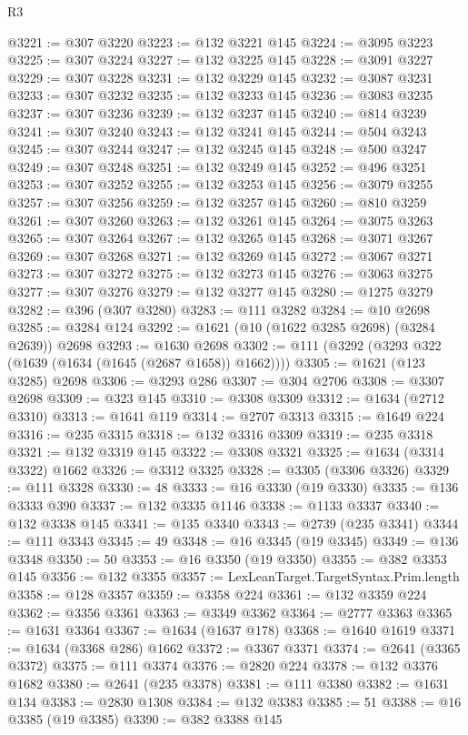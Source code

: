\begin{lexlean}{R3}
\begin{coremodule}
@3221 := @307 @3220
@3223 := @132 @3221 @145
@3224 := @3095 @3223
@3225 := @307 @3224
@3227 := @132 @3225 @145
@3228 := @3091 @3227
@3229 := @307 @3228
@3231 := @132 @3229 @145
@3232 := @3087 @3231
@3233 := @307 @3232
@3235 := @132 @3233 @145
@3236 := @3083 @3235
@3237 := @307 @3236
@3239 := @132 @3237 @145
@3240 := @814 @3239
@3241 := @307 @3240
@3243 := @132 @3241 @145
@3244 := @504 @3243
@3245 := @307 @3244
@3247 := @132 @3245 @145
@3248 := @500 @3247
@3249 := @307 @3248
@3251 := @132 @3249 @145
@3252 := @496 @3251
@3253 := @307 @3252
@3255 := @132 @3253 @145
@3256 := @3079 @3255
@3257 := @307 @3256
@3259 := @132 @3257 @145
@3260 := @810 @3259
@3261 := @307 @3260
@3263 := @132 @3261 @145
@3264 := @3075 @3263
@3265 := @307 @3264
@3267 := @132 @3265 @145
@3268 := @3071 @3267
@3269 := @307 @3268
@3271 := @132 @3269 @145
@3272 := @3067 @3271
@3273 := @307 @3272
@3275 := @132 @3273 @145
@3276 := @3063 @3275
@3277 := @307 @3276
@3279 := @132 @3277 @145
@3280 := @1275 @3279
@3282 := @396 (@307 @3280)
@3283 := @111 @3282
@3284 := @10 @2698
@3285 := @3284 @124
@3292 := @1621 (@10 (@1622 @3285 @2698) (@3284 @2639)) @2698
@3293 := @1630 @2698
@3302 := @111 (@3292 (@3293 @322 (@1639 (@1634 (@1645 (@2687 @1658)) @1662))))
@3305 := @1621 (@123 @3285) @2698
@3306 := @3293 @286
@3307 := @304 @2706
@3308 := @3307 @2698
@3309 := @323 @145
@3310 := @3308 @3309
@3312 := @1634 (@2712 @3310)
@3313 := @1641 @119
@3314 := @2707 @3313
@3315 := @1649 @224
@3316 := @235 @3315
@3318 := @132 @3316 @3309
@3319 := @235 @3318
@3321 := @132 @3319 @145
@3322 := @3308 @3321
@3325 := @1634 (@3314 @3322) @1662
@3326 := @3312 @3325
@3328 := @3305 (@3306 @3326)
@3329 := @111 @3328
@3330 := 48
@3333 := @16 @3330 (@19 @3330)
@3335 := @136 @3333 @390
@3337 := @132 @3335 @1146
@3338 := @1133 @3337
@3340 := @132 @3338 @145
@3341 := @135 @3340
@3343 := @2739 (@235 @3341)
@3344 := @111 @3343
@3345 := 49
@3348 := @16 @3345 (@19 @3345)
@3349 := @136 @3348
@3350 := 50
@3353 := @16 @3350 (@19 @3350)
@3355 := @382 @3353 @145
@3356 := @132 @3355
@3357 := LexLeanTarget.TargetSyntax.Prim.length
@3358 := @128 @3357
@3359 := @3358 @224
@3361 := @132 @3359 @224
@3362 := @3356 @3361
@3363 := @3349 @3362
@3364 := @2777 @3363
@3365 := @1631 @3364
@3367 := @1634 (@1637 @178)
@3368 := @1640 @1619
@3371 := @1634 (@3368 @286) @1662
@3372 := @3367 @3371
@3374 := @2641 (@3365 @3372)
@3375 := @111 @3374
@3376 := @2820 @224
@3378 := @132 @3376 @1682
@3380 := @2641 (@235 @3378)
@3381 := @111 @3380
@3382 := @1631 @134
@3383 := @2830 @1308
@3384 := @132 @3383
@3385 := 51
@3388 := @16 @3385 (@19 @3385)
@3390 := @382 @3388 @145

\end{coremodule}
\end{lexlean}
